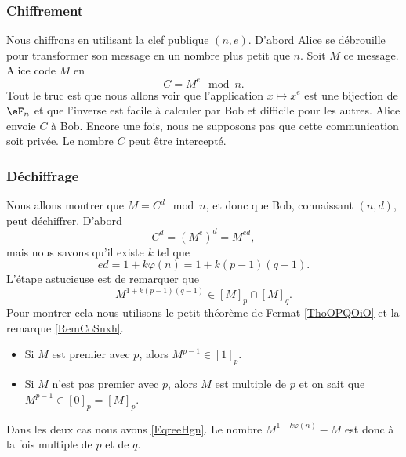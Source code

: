 \subsubsection{Chiffrement}

Nous chiffrons en utilisant la clef publique \( (n,e)\). D'abord Alice se débrouille pour transformer son message en un nombre plus petit que \( n\). Soit \( M\) ce message. Alice code \( M\) en
\begin{equation}
    C=M^e\mod n.
\end{equation}
Tout le truc est que nous allons voir que l'application \( x\mapsto x^e\) est une bijection de \( \eF_n\) et que l'inverse est facile à calculer par Bob et difficile pour les autres. Alice envoie \( C\) à Bob. Encore une fois, nous ne supposons pas que cette communication soit privée. Le nombre \( C\) peut être intercepté.

\subsubsection{Déchiffrage}

Nous allons montrer que \( M=C^d\mod n\), et donc que Bob, connaissant \( (n,d)\), peut déchiffrer. D'abord
\begin{equation}
    C^d=(M^e)^d=M^{ed},
\end{equation}
mais nous savons qu'il existe \( k\) tel que
\begin{equation}
    ed=1+k\varphi(n)=1+k(p-1)(q-1).
\end{equation}
L'étape astucieuse est de remarquer que
\begin{equation}    \label{EqreeHgn}
    M^{1+k(p-1)(q-1)}\in [M]_p\cap[M]_q.
\end{equation}
Pour montrer cela nous utilisons le petit théorème de Fermat \ref{ThoOPQOiO} et la remarque \ref{RemCoSnxh}.
\begin{itemize}
    \item Si \( M\) est premier avec \( p\), alors \( M^{p-1}\in[1]_p\).
    \item Si \( M\) n'est pas premier avec \( p\), alors \( M\) est multiple de \( p\) et on sait que \( M^{p-1}\in[0]_p=[M]_p\).
\end{itemize}
Dans les deux cas nous avons \eqref{EqreeHgn}. Le nombre \( M^{1+k\varphi(n)}-M\) est donc à la fois multiple de \( p\) et de \( q\).

